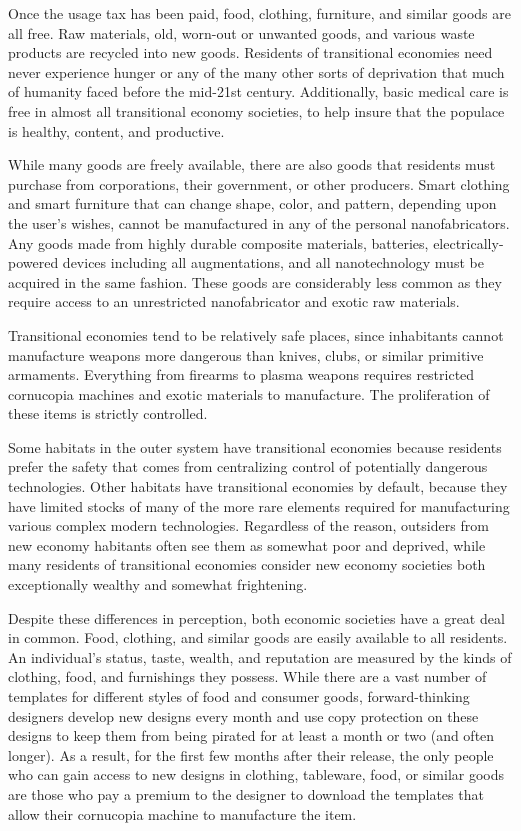 Once the usage tax has been paid, food, clothing, furniture, and similar goods are all free. Raw materials, old, worn-out or unwanted goods, and various waste products are recycled into new goods. Residents of transitional economies need never experience hunger or any of the many other sorts of deprivation that much of humanity faced before the mid-21st century. Additionally, basic medical care is free in almost all transitional economy societies, to help insure that the populace is healthy, content, and productive. 

While many goods are freely available, there are also goods that residents must purchase from corporations, their government, or other producers. Smart clothing and smart furniture that can change shape, color, and pattern, depending upon the user's wishes, cannot be manufactured in any of the personal nanofabricators. Any goods made from highly durable composite materials, batteries, electrically-powered devices including all augmentations, and all nanotechnology must be acquired in the same fashion. These goods are considerably less common as they require access to an unrestricted nanofabricator and exotic raw materials. 

Transitional economies tend to be relatively safe places, since inhabitants cannot manufacture weapons more dangerous than knives, clubs, or similar primitive armaments. Everything from firearms to plasma weapons requires restricted cornucopia machines and exotic materials to manufacture. The proliferation of these items is strictly controlled. 

Some habitats in the outer system have transitional economies because residents prefer the safety that comes from centralizing control of potentially dangerous technologies. Other habitats have transitional economies by default, because they have limited stocks of many of the more rare elements required for manufacturing various complex modern technologies. Regardless of the reason, outsiders from new economy habitants often see them as somewhat poor and deprived, while many residents of transitional economies consider new economy societies both exceptionally wealthy and somewhat frightening. 

Despite these differences in perception, both economic societies have a great deal in common. Food, clothing, and similar goods are easily available to all residents. An individual's status, taste, wealth, and reputation are measured by the kinds of clothing, food, and furnishings they possess. While there are a vast number of templates for different styles of food and consumer goods, forward-thinking designers develop new designs every month and use copy protection on these designs to keep them from being pirated for at least a month or two (and often longer). As a result, for the first few months after their release, the only people who can gain access to new designs in clothing, tableware, food, or similar goods are those who pay a premium to the designer to download the templates that allow their cornucopia machine to manufacture the item. 

